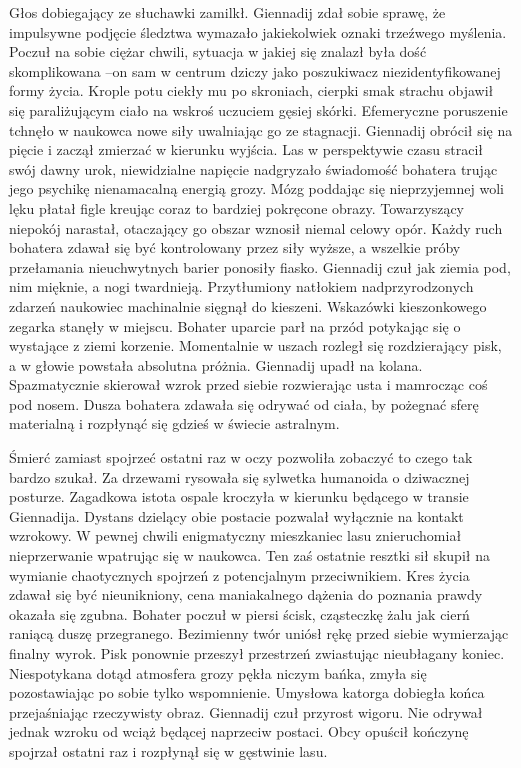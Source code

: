 \documentclass[../MAIN.tex]{subfiles}
\begin{document}
Głos dobiegający ze słuchawki zamilkł. Giennadij zdał sobie sprawę, że impulsywne podjęcie śledztwa wymazało jakiekolwiek oznaki trzeźwego myślenia. Poczuł na sobie ciężar chwili, sytuacja w jakiej się znalazł była dość skomplikowana --on sam w centrum dziczy jako poszukiwacz niezidentyfikowanej formy życia. Krople potu ciekły mu po skroniach, cierpki smak strachu objawił się paraliżującym ciało na wskroś uczuciem gęsiej skórki. Efemeryczne poruszenie tchnęło w naukowca nowe siły uwalniając go ze stagnacji. Giennadij obrócił się na pięcie i zaczął zmierzać w kierunku wyjścia. Las w perspektywie czasu stracił swój dawny urok, niewidzialne napięcie nadgryzało świadomość bohatera trując jego psychikę nienamacalną energią grozy. Mózg poddając się nieprzyjemnej woli lęku płatał figle kreując coraz to bardziej pokręcone obrazy. Towarzyszący niepokój narastał, otaczający go obszar wznosił niemal celowy opór. Każdy ruch bohatera zdawał się być kontrolowany przez siły wyższe, a wszelkie próby przełamania nieuchwytnych barier ponosiły fiasko. Giennadij czuł jak ziemia pod, nim mięknie, a nogi twardnieją. Przytłumiony natłokiem nadprzyrodzonych zdarzeń naukowiec machinalnie sięgnął do kieszeni. Wskazówki kieszonkowego zegarka stanęły w miejscu. Bohater uparcie parł na przód potykając się o wystające z ziemi korzenie. Momentalnie w uszach rozległ się rozdzierający pisk, a w głowie powstała absolutna próżnia. Giennadij upadł na kolana. Spazmatycznie skierował wzrok przed siebie rozwierając usta i mamrocząc coś pod nosem. Dusza bohatera zdawała się odrywać od ciała, by pożegnać sferę materialną i rozpłynąć się gdzieś w świecie astralnym. 

Śmierć zamiast spojrzeć ostatni raz w oczy pozwoliła zobaczyć to czego tak bardzo szukał. Za drzewami rysowała się sylwetka humanoida o dziwacznej posturze. Zagadkowa istota ospale kroczyła w kierunku będącego w transie Giennadija. Dystans dzielący obie postacie pozwalał wyłącznie na kontakt wzrokowy. W pewnej chwili enigmatyczny mieszkaniec lasu znieruchomiał nieprzerwanie wpatrując się w naukowca. Ten zaś ostatnie resztki sił skupił na wymianie chaotycznych spojrzeń z potencjalnym przeciwnikiem. Kres życia zdawał się być nieunikniony, cena maniakalnego dążenia do poznania prawdy okazała się zgubna. Bohater poczuł w piersi ścisk, cząsteczkę żalu jak cierń raniącą duszę przegranego. Bezimienny twór uniósł rękę przed siebie wymierzając finalny wyrok. Pisk ponownie przeszył przestrzeń zwiastując nieubłagany koniec. Niespotykana dotąd atmosfera grozy pękła niczym bańka, zmyła się pozostawiając po sobie tylko wspomnienie. Umysłowa katorga dobiegła końca przejaśniając rzeczywisty obraz. Giennadij czuł przyrost wigoru. Nie odrywał jednak wzroku od wciąż będącej naprzeciw postaci. Obcy opuścił kończynę spojrzał ostatni raz i rozpłynął się w gęstwinie lasu. 
\end{document}

